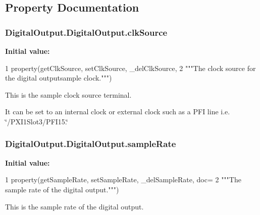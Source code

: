\subsection{Property Documentation}
\hypertarget{class_digital_output_1_1_digital_output_ac666f33f58ca6f93d9aaeb93f917e81c}{
\subsubsection[{clk\-Source}]{\setlength{\rightskip}{0pt plus 5cm}Digital\-Output.\-Digital\-Output.\-clk\-Source\hspace{0.3cm}{\ttfamily [static]}}}\label{class_digital_output_1_1_digital_output_ac666f33f58ca6f93d9aaeb93f917e81c}
{\bfseries Initial value\-:}
\begin{DoxyCode}
1 property(getClkSource, setClkSource, \_delClkSource,
2     \textcolor{stringliteral}{"""The clock source for the digital outputsample clock."""})
\end{DoxyCode}


This is the sample clock source terminal. 

It can be set to an internal clock or external clock such as a P\-F\-I line i.\-e. \char`\"{}/\-P\-X\-I1\-Slot3/\-P\-F\-I15.\char`\"{} \hypertarget{class_digital_output_1_1_digital_output_a3c7b4cb824baa168977ef85dbbc4d1d5}{
\subsubsection[{sample\-Rate}]{\setlength{\rightskip}{0pt plus 5cm}Digital\-Output.\-Digital\-Output.\-sample\-Rate\hspace{0.3cm}{\ttfamily [static]}}}\label{class_digital_output_1_1_digital_output_a3c7b4cb824baa168977ef85dbbc4d1d5}
{\bfseries Initial value\-:}
\begin{DoxyCode}
1 property(getSampleRate, setSampleRate, \_delSampleRate, doc=
2                              \textcolor{stringliteral}{"""The sample rate of the digital output."""})
\end{DoxyCode}


This is the sample rate of the digital output. 

